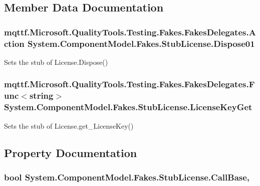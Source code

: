 \subsection{Member Data Documentation}
\hypertarget{class_system_1_1_component_model_1_1_fakes_1_1_stub_license_a83fa3bd11271d064e6fa0ccdb879459e}{
\subsubsection[{Dispose01}]{\setlength{\rightskip}{0pt plus 5cm}mqttf.\-Microsoft.\-Quality\-Tools.\-Testing.\-Fakes.\-Fakes\-Delegates.\-Action System.\-Component\-Model.\-Fakes.\-Stub\-License.\-Dispose01}}\label{class_system_1_1_component_model_1_1_fakes_1_1_stub_license_a83fa3bd11271d064e6fa0ccdb879459e}


Sets the stub of License.\-Dispose()

\hypertarget{class_system_1_1_component_model_1_1_fakes_1_1_stub_license_a128ec995a70c320712e5c844b6c6cf35}{
\subsubsection[{License\-Key\-Get}]{\setlength{\rightskip}{0pt plus 5cm}mqttf.\-Microsoft.\-Quality\-Tools.\-Testing.\-Fakes.\-Fakes\-Delegates.\-Func$<$string$>$ System.\-Component\-Model.\-Fakes.\-Stub\-License.\-License\-Key\-Get}}\label{class_system_1_1_component_model_1_1_fakes_1_1_stub_license_a128ec995a70c320712e5c844b6c6cf35}


Sets the stub of License.\-get\-\_\-\-License\-Key()



\subsection{Property Documentation}
\hypertarget{class_system_1_1_component_model_1_1_fakes_1_1_stub_license_abbf73843cc0c33449b0c3111cde31cfd}{
\subsubsection[{Call\-Base}]{\setlength{\rightskip}{0pt plus 5cm}bool System.\-Component\-Model.\-Fakes.\-Stub\-License.\-Call\-Base\hspace{0.3cm}{\ttfamily [get]}, {\ttfamily [set]}}}\label{class_system_1_1_component_model_1_1_fakes_1_1_stub_license_abbf73843cc0c33449b0c3111cde31cfd}


